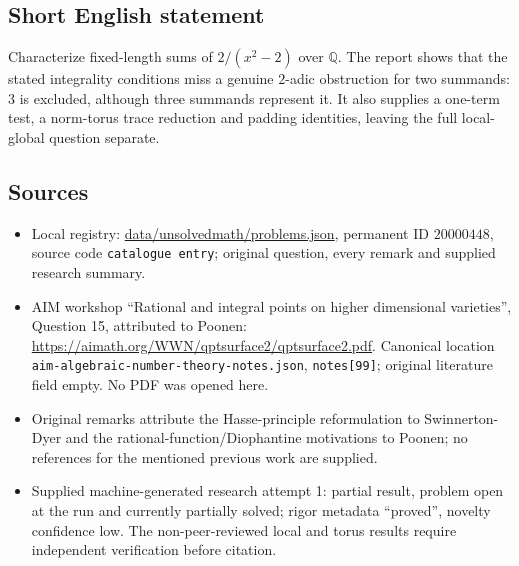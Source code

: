\documentclass[11pt]{article}
\newcommand{\Q}{\mathbb{Q}}
\begin{document}
\subsection{Short English statement}
Characterize fixed-length sums of $2/(x^2-2)$ over $\Q$. The report shows that the stated integrality conditions miss a genuine $2$-adic obstruction for two summands: $3$ is excluded, although three summands represent it. It also supplies a one-term test, a norm-torus trace reduction and padding identities, leaving the full local-global question separate.
\subsection{Sources}
\begin{itemize}
\item Local registry: \url{data/unsolvedmath/problems.json}, permanent ID $20000448$, source code \texttt{catalogue entry}; original question, every remark and supplied research summary.
\item AIM workshop ``Rational and integral points on higher dimensional varieties'', Question 15, attributed to Poonen: \url{https://aimath.org/WWN/qptsurface2/qptsurface2.pdf}. Canonical location \texttt{aim-algebraic-number-theory-notes.json}, \texttt{notes[99]}; original literature field empty. No PDF was opened here.
\item Original remarks attribute the Hasse-principle reformulation to Swinnerton-Dyer and the rational-function/Diophantine motivations to Poonen; no references for the mentioned previous work are supplied.
\item Supplied machine-generated research attempt 1: partial result, problem open at the run and currently partially solved; rigor metadata ``proved'', novelty confidence low. The non-peer-reviewed local and torus results require independent verification before citation.
\end{itemize}
\end{document}
